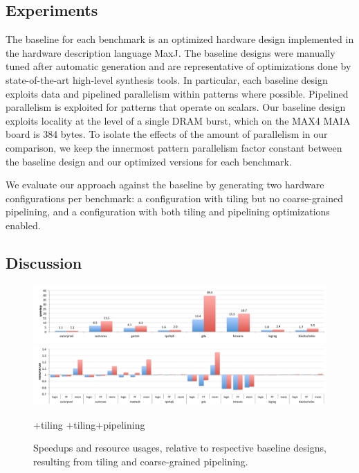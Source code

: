 


\subsection{Experiments}
The baseline for each benchmark is an optimized hardware design implemented in the
hardware description language MaxJ.
The baseline designs were manually tuned after automatic generation and are
representative of optimizations done by state-of-the-art high-level synthesis tools.
In particular, each baseline design exploits data and pipelined parallelism within patterns where possible.
Pipelined parallelism is exploited for patterns that operate on scalars. Our baseline design
exploits locality at the level of a single DRAM burst, which on the MAX4 MAIA board is 384 bytes.
To isolate the effects of the amount of parallelism in our comparison, we keep
the innermost pattern parallelism factor constant between the baseline design and our optimized versions for each benchmark.

We evaluate our approach against the baseline by generating two hardware configurations per benchmark:
a configuration with tiling but no coarse-grained pipelining, and a configuration with both tiling and pipelining optimizations enabled.

\subsection{Discussion}

\begin{figure}
\centering
\includegraphics[width=\textwidth]{3-delite/figs/newspeedupbars1.pdf}
\vspace{10pt}
\includegraphics[width=\textwidth]{3-delite/figs/newspeedupbars2.pdf}

{
\selectfont
\footnotesize
{}
+tiling
\hspace{2em}
+tiling+pipelining
}

\caption{Speedups and resource usages, relative to respective baseline designs, resulting from tiling and coarse-grained pipelining.}
\label{fig:speedup-bars}
\end{figure}

